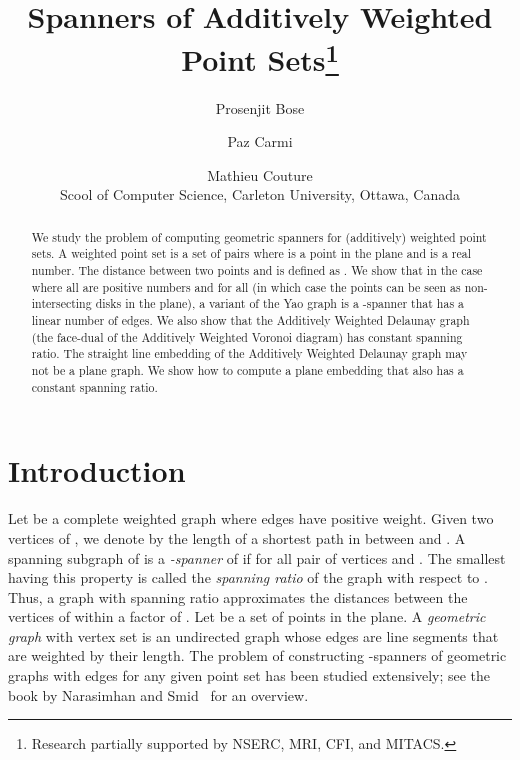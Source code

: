 \documentclass[pdftex,leqno,fleqn,12pt]{article}
\begin{document}
\title{Spanners of Additively Weighted Point Sets\thanks{Research partially supported by NSERC, MRI, CFI, and MITACS.}}
\author{Prosenjit Bose \and Paz Carmi \and Mathieu Couture\\ {\small Scool of Computer Science, Carleton University, Ottawa, Canada}}




\maketitle

\begin{abstract} We study the problem of computing geometric spanners for
(additively) weighted point sets. A weighted point set is a set of pairs  where  is a
point in the plane and  is a real number. The distance between two points  and
 is defined as . We show that in the case where all  are positive
numbers and  for all  (in which case the points can be seen as
non-intersecting disks in the plane), a variant of the Yao graph is a -spanner that
has a linear number of edges. We also show that the Additively Weighted Delaunay graph (the
face-dual of the Additively Weighted Voronoi diagram) has constant spanning ratio. The straight
line embedding of the Additively Weighted Delaunay graph may not be a plane graph. 
We show how to compute a plane embedding that also has a
constant spanning ratio.  \end{abstract}

\newcommand{\UDG}{\rm UDG}
\newcommand{\bis}{\rm bis}

\newpage

\section{Introduction}

Let  be a complete weighted graph where edges have positive weight. Given
two vertices  of , we denote by  the length of a
shortest path in  between  and . A spanning subgraph  of  is
a \emph{-spanner} of  if  for all
pair of vertices  and . The smallest  having this property is
called the \emph{spanning ratio} of the graph  with respect to . Thus,
a graph with spanning ratio  approximates the  distances
between the vertices of  within a factor of . Let  be a set of 
points in the plane. A \emph{geometric graph} with vertex set  is an
undirected graph whose edges are line segments that are weighted by their
length.  The problem of constructing -spanners of geometric graphs with
 edges for any given point set has been studied extensively; see the
book by Narasimhan and Smid~\cite{smid07} for an overview.
\end{document}
